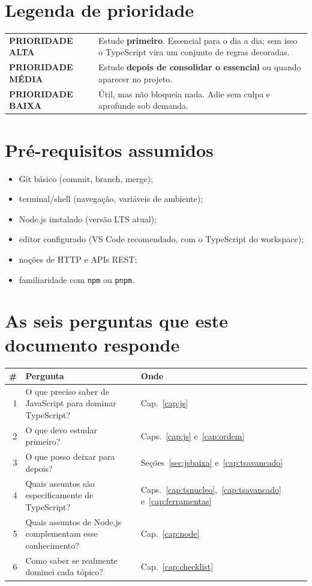 \documentclass[12pt,a4paper,oneside]{book}
\newcommand{\alta}{\colorbox{red!15}{\sffamily\scriptsize\bfseries PRIORIDADE ALTA}}
\newcommand{\media}{\colorbox{orange!20}{\sffamily\scriptsize\bfseries PRIORIDADE MÉDIA}}
\newcommand{\baixa}{\colorbox{gray!20}{\sffamily\scriptsize\bfseries PRIORIDADE BAIXA}}
\newcommand{\code}[1]{\texttt{#1}}
\begin{document}
\section*{Legenda de prioridade}

\begin{tabularx}{\textwidth}{@{}lX@{}}
\toprule
\alta & Estude \textbf{primeiro}. Essencial para o dia a dia; sem isso o TypeScript vira um conjunto de regras decoradas. \\
\media & Estude \textbf{depois de consolidar o essencial} ou quando aparecer no projeto. \\
\baixa & Útil, mas não bloqueia nada. Adie sem culpa e aprofunde sob demanda. \\
\bottomrule
\end{tabularx}

\section*{Pré-requisitos assumidos}

\begin{itemize}
  \item Git básico (commit, branch, merge);
  \item terminal/shell (navegação, variáveis de ambiente);
  \item Node.js instalado (versão LTS atual);
  \item editor configurado (VS Code recomendado, com o TypeScript do workspace);
  \item noções de HTTP e APIs REST;
  \item familiaridade com \code{npm} ou \code{pnpm}.
\end{itemize}

\section*{As seis perguntas que este documento responde}

\begin{tabularx}{\textwidth}{@{}rXl@{}}
\toprule
\# & Pergunta & Onde \\
\midrule
1 & O que preciso saber de JavaScript para dominar TypeScript? & Cap.~\ref{cap:js} \\
2 & O que devo estudar primeiro? & Caps.~\ref{cap:js} e~\ref{cap:ordem} \\
3 & O que posso deixar para depois? & Seções~\ref{sec:jsbaixa} e~\ref{cap:tsavancado} \\
4 & Quais assuntos são especificamente de TypeScript? & Caps.~\ref{cap:tsnucleo},~\ref{cap:tsavancado} e~\ref{cap:ferramentas} \\
5 & Quais assuntos de Node.js complementam esse conhecimento? & Cap.~\ref{cap:node} \\
6 & Como saber se realmente dominei cada tópico? & Cap.~\ref{cap:checklist} \\
\bottomrule
\end{tabularx}
\end{document}
